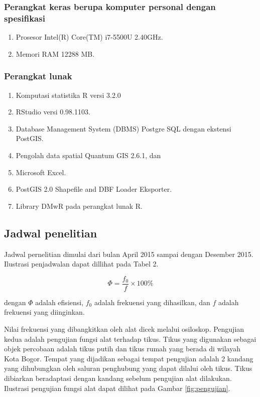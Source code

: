 \subsubsection*{Perangkat keras berupa komputer personal dengan spesifikasi}
\begin{enumerate}[noitemsep] 
	\item Prosesor Intel(R) Core(TM) i7-5500U  2.40GHz.
	\item Memori RAM 12288 MB.
\end{enumerate}

\subsubsection*{Perangkat lunak}
\begin{enumerate}[noitemsep] 
	\item Komputasi statistika R versi 3.2.0
	\item RStudio versi 0.98.1103.
	\item Database Management System (DBMS) Postgre SQL dengan ekstensi PostGIS.
	\item Pengolah data spatial Quantum GIS 2.6.1, dan
	\item Microsoft Excel.
	\item PostGIS 2.0 Shapefile and DBF Loader Eksporter.
	\item Library DMwR pada perangkat lunak R.
\end{enumerate}



\subsection*{Jadwal penelitian}
Jadwal pernelitian dimulai dari bulan April 2015 sampai dengan Desember 2015. Ilustrasi penjadwalan dapat dillihat pada Tabel 2.

\begin{equation}
\Phi = \frac{f_0}{f}\times 100\%
\label{eq:persamaan}
\end{equation}

\noindent dengan $\Phi$ adalah efisiensi, $f_0$ adalah frekuensi yang dihasilkan, dan $f$ adalah frekuensi yang diinginkan.

Nilai frekuensi yang dibangkitkan oleh alat dicek melalui osiloskop. Pengujian kedua adalah pengujian fungsi alat terhadap tikus. Tikus yang digunakan sebagai objek percobaan adalah tikus putih dan tikus rumah yang berada di wilayah Kota Bogor. Tempat yang dijadikan sebagai tempat pengujian adalah 2 kandang yang dihubungkan oleh saluran penghubung yang dapat dilalui oleh tikus. Tikus dibiarkan beradaptasi dengan kandang sebelum pengujian alat dilakukan. Ilustrasi pengujian fungsi alat dapat dilihat pada Gambar \ref{fig:pengujian}.

